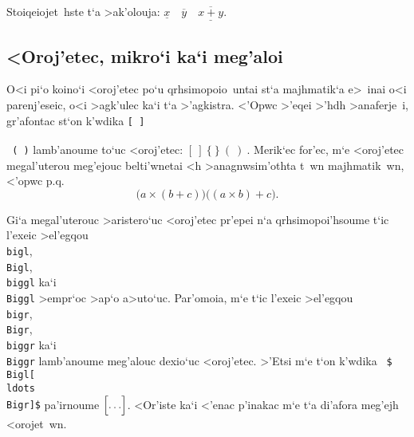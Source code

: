 \exercise Stoiqeiojet~hste t`a >ak'olouja: $\underline x \quad \overline
y \quad \underline{\overline{x+y}}$.

\subsection{<Oroj'etec, mikro`i ka`i meg'aloi}

O<i pi`o koino`i <oroj'etec po`u qrhsimopoio~untai st`a majhmatik`a
e>~inai o<i parenj'eseic, o<i >agk'ulec ka`i t`a >'agkistra.  <'Opwc
>'eqei >'hdh >anaferje~i, gr'afontac st`on k'wdika {\tt [ ] \\\lb\
\\\rb\ ( )} lamb'anoume to`uc <oroj'etec: $[\>]\>\{\>\}\>(\>)\>$.  
Merik`ec for'ec, m`e <oroj'etec megal'uterou meg'ejouc belti'wnetai <h
>anagnwsim'othta t~wn majhmatik~wn, <'opwc p.q.
$$\bigl(a\times(b+c)\bigr) \bigl((a\times b)+c\bigr).$$

Gi`a megal'uterouc >aristero`uc <oroj'etec pr'epei n`a qrhsimopoi'hsoume
t`ic l'exeic >el'egqou {\tt \\bigl}, {\tt \\Bigl}, {\tt \\biggl} ka`i
{\tt  \\Biggl} >empr`oc >ap`o a>uto`uc. Par'omoia, m`e t`ic l'exeic
>el'egqou {\tt \\bigr}, {\tt \\Bigr}, {\tt \\biggr} ka`i {\tt \\Biggr}
lamb'anoume meg'alouc dexio`uc <oroj'etec. >'Etsi m`e t`on k'wdika {\tt
\$\\Bigl[ \\ldots \\Bigr]\$} pa'irnoume $\Bigl[ \ldots
\Bigr]$\null. <Or'iste ka`i <'enac p'inakac m`e t`a
di'afora meg'ejh <orojet~wn.

